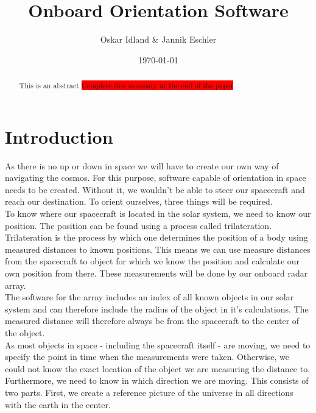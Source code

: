 \documentclass[reprint,english,notitlepage]{revtex4-2}
\begin{document}
\title{Onboard Orientation Software}
\author{Oskar Idland \& Jannik Eschler}
\date{\today}

\begin{abstract}
    This is an abstract \colorbox{red}{Complete this summary at the end of the paper}
\end{abstract}
\maketitle

\section{Introduction} \label{sec:introduction}
As there is no up or down in space we will have to create our own way of navigating the cosmos.
For this purpose, software capable of orientation in space needs to be created.
Without it, we wouldn't be able to steer our spacecraft and reach our destination.
To orient ourselves, three things will be required.\\
To know where our spacecraft is located in the solar system, we need to know our position.
The position can be found using a process called trilateration.\\
Trilateration is the process by which one determines the position of a body using measured distances to known positions.%
This means we can use measure distances from the spacecraft to object for which we know the position and calculate our own position from there.
These measurements will be done by our onboard radar array.\\
The software for the array includes an index of all known objects in our solar system and can therefore include the radius of the object in it's calculations.
The measured distance will therefore always be from the spacecraft to the center of the object.\\
As most objects in space - including the spacecraft itself - are moving, we need to specify the point in time when the measurements were taken.
Otherwise, we could not know the exact location of the object we are measuring the distance to.\\
Furthermore, we need to know in which direction we are moving.
This consists of two parts.
First, we create a reference picture of the universe in all directions with the earth in the center.
\end{document}

